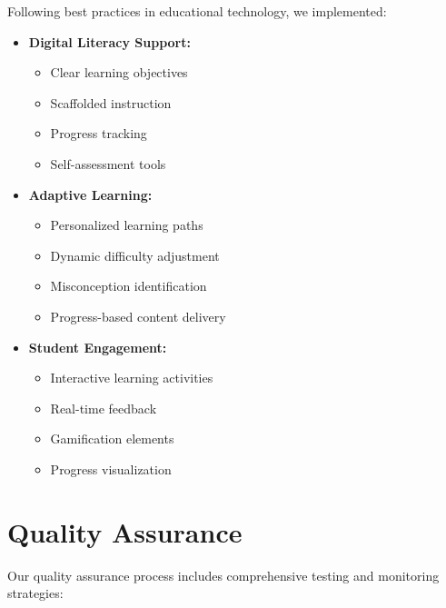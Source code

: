 Following best practices in educational technology, we implemented:

\begin{itemize}
  \item \textbf{Digital Literacy Support:}
    \begin{itemize}
      \item Clear learning objectives
      \item Scaffolded instruction
      \item Progress tracking
      \item Self-assessment tools
    \end{itemize}
  
  \item \textbf{Adaptive Learning:}
    \begin{itemize}
      \item Personalized learning paths
      \item Dynamic difficulty adjustment
      \item Misconception identification
      \item Progress-based content delivery
    \end{itemize}
  
  \item \textbf{Student Engagement:}
    \begin{itemize}
      \item Interactive learning activities
      \item Real-time feedback
      \item Gamification elements
      \item Progress visualization
    \end{itemize}
\end{itemize}

\section{Quality Assurance}
\label{sec:qa}

Our quality assurance process includes comprehensive testing and monitoring strategies:

